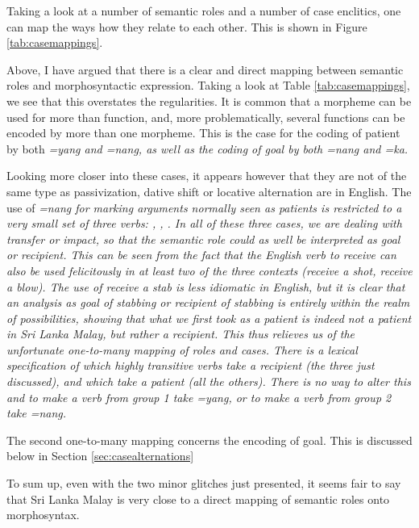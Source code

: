\documentclass[a4paper,10pt]{article}
\begin{document}
Taking a look at a number of semantic roles and a number of case enclitics, one can map the ways how they relate to each other. This is shown in Figure \ref{tab:casemappings}.


Above, I have argued that there is a clear and direct mapping between semantic roles and morphosyntactic expression. Taking a look at Table \ref{tab:casemappings}, we see that this overstates the regularities. It is common that a morpheme can be used for more than function, and, more problematically, several functions can be encoded by more than one morpheme. This is the case for the coding of patient by both \em =yang \em and \em =nang\em, as well as the coding of goal by both \em =nang \em and \em =ka\em.

Looking more closer into these cases, it appears however that they are not of the same type as passivization, dative shift or locative alternation are in English. The use of \em =nang \em for marking arguments normally seen as patients is restricted to a very small set of three verbs: 
, 
,
. In all of these three cases, we are dealing with transfer or impact, so that the semantic role could as well be interpreted as goal or recipient. This can be seen from the fact that the English verb \em to receive \em can also be used felicitously in at least two of the three contexts (\em receive a shot, receive a blow\em). The use of \em receive a stab \em is less idiomatic in English, but it is clear that an analysis as goal of stabbing or recipient of stabbing is entirely within the realm of possibilities, showing that what we first took as a patient is indeed not a patient in Sri Lanka Malay, but rather a recipient. This thus relieves us of the unfortunate one-to-many mapping of roles and cases. There is a lexical specification of which highly transitive verbs take a recipient (the three just discussed), and which take a patient (all the others). There is no way to alter this and to make a verb from group 1 take \em =yang\em, or to make a verb from group 2 take \em =nang\em.

The second one-to-many mapping concerns the encoding of goal. This is discussed below in Section \ref{sec:casealternations}

To sum up, even with the two minor glitches just presented, it seems fair to say that Sri Lanka Malay is very close to a direct mapping of semantic roles onto morphosyntax.
\end{document}
